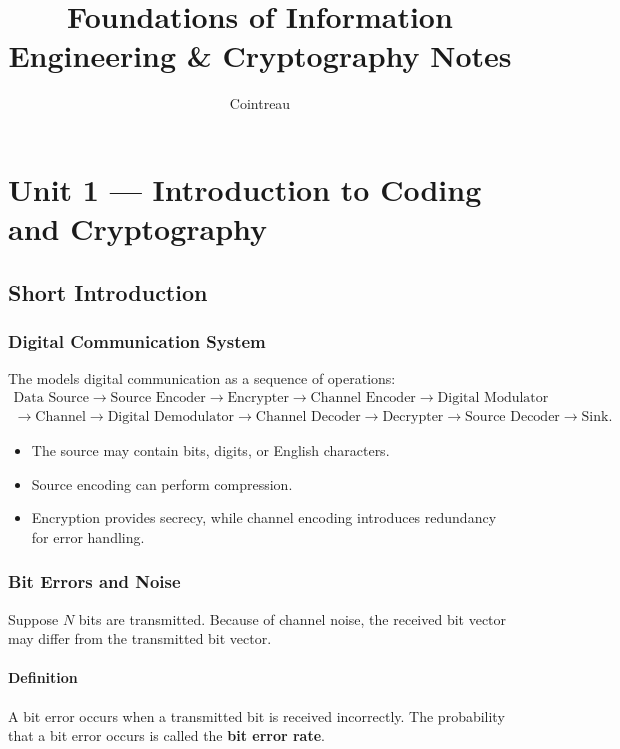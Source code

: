 \documentclass[12pt]{article}
\title{\textbf{Foundations of Information Engineering \& Cryptography Notes}}
\author{Cointreau}
\newcommand{\Definition}{\paragraph{Definition}}
\begin{document}
\maketitle
\tableofcontents
\newpage

\section{Unit 1 --- Introduction to Coding and Cryptography}

\subsection{Short Introduction}

\subsubsection{Digital Communication System}
The models digital communication as a sequence of operations:
\[
\begin{array}{c}
\text{Data Source}\rightarrow\text{Source Encoder}\rightarrow\text{Encrypter}\rightarrow\text{Channel Encoder}\rightarrow\text{Digital Modulator}\\
\rightarrow\text{Channel}\rightarrow\text{Digital Demodulator}\rightarrow\text{Channel Decoder}\rightarrow\text{Decrypter}\rightarrow\text{Source Decoder}\rightarrow\text{Sink}.
\end{array}
\]
\begin{itemize}
    \item The source may contain bits, digits, or English characters. 
    \item Source encoding can perform compression. 
    \item Encryption provides secrecy, while channel encoding introduces redundancy for error handling.
\end{itemize}

\subsubsection{Bit Errors and Noise}
Suppose $N$ bits are transmitted. Because of channel noise, the received bit vector may differ from the transmitted bit vector.

\Definition A bit error occurs when a transmitted bit is received incorrectly. The probability that a bit error occurs is called the \textbf{bit error rate}.
\end{document}
